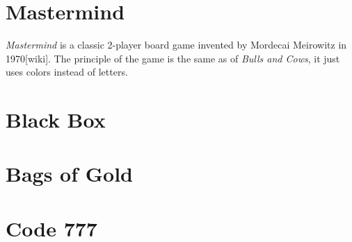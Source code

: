 \section{Mastermind}

\emph{Mastermind} is a classic 2-player board game invented by Mordecai Meirowitz in 1970[wiki].
The principle of the game is the same as of \emph{Bulls and Cows}, it just uses colors instead of letters.

\section{Black Box}

\section{Bags of Gold}

\section{Code 777}


